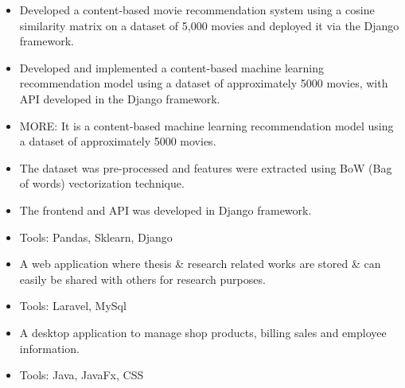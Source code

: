 \documentclass[10pt,a4paper,ragged2e,withhyper]{altacv}
\begin{document}
\vspace{0.3em}
\begin{itemize}
\item Developed a content-based movie recommendation system using a cosine similarity matrix on a dataset of 5,000 movies and deployed it via the Django framework.
\item Developed and implemented a content-based machine learning recommendation model using a dataset of approximately 5000 movies, with API developed in the Django framework.
\item MORE: It is a content-based machine learning recommendation model using a dataset of approximately 5000 movies.
\item The dataset was pre-processed and features were extracted using BoW (Bag of words) vectorization technique.
\item The frontend and API was developed in Django framework.
\item Tools: Pandas, Sklearn, Django
\end{itemize}

\vspace{0.3em}
\begin{itemize}
\item A web application where thesis \& research related works are
stored \& can easily be shared with others for research purposes.
\item Tools: Laravel, MySql
\end{itemize}

\vspace{0.3em}
\begin{itemize}
\item  A desktop application to manage shop products, billing sales and employee information.
\item Tools: Java, JavaFx, CSS
\end{itemize}

\end{document}
